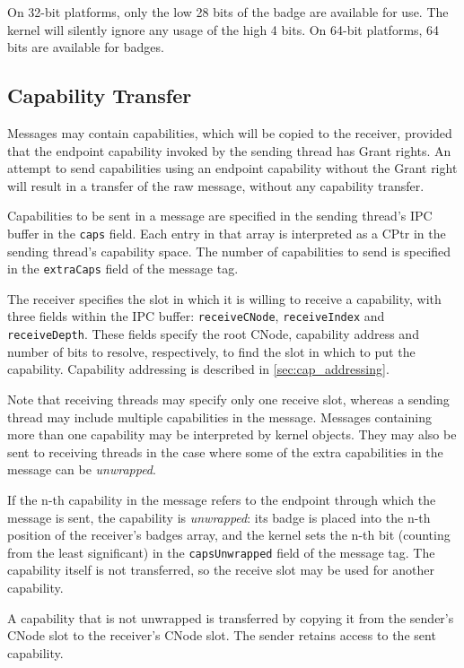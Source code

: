 On 32-bit platforms, only the low 28 bits of the badge are available for use.
The kernel will silently ignore any usage of the high 4 bits.
On 64-bit platforms, 64 bits are available for badges.

\subsection{Capability Transfer}
\label{sec:cap-transfer}

Messages may contain capabilities, which will be copied to the
receiver, provided that the endpoint capability
invoked by the sending thread has Grant rights. An attempt to send
capabilities using an endpoint capability without the Grant right will
result in a transfer of the raw message, without any capability transfer.

Capabilities to be sent in a message are specified in the sending thread's
IPC buffer in the \texttt{caps} field. Each entry in that array is interpreted
as a CPtr in the sending thread's capability space. The number of capabilities
to send is specified in the \texttt{extraCaps} field of the message tag.

The receiver specifies the slot
in which it is willing to receive a capability, with three fields within the IPC buffer: \texttt{receiveCNode}, \texttt{receiveIndex} and \texttt{receiveDepth}.
These fields specify the root CNode, capability address and number of bits to resolve, respectively, to find
the slot in which to put the capability. Capability
addressing is described in \autoref{sec:cap_addressing}.

Note that receiving threads may specify only one receive slot, whereas a
sending thread may include multiple capabilities in the message. Messages
containing more than one capability may be interpreted by kernel objects. They
may also be sent to receiving threads in the case where some of the extra
capabilities in the message can be \emph{unwrapped}.

If the n-th capability in the message refers to the endpoint through
which the message is sent, the capability is \emph{unwrapped}: its badge is placed into
the n-th
position of the receiver's badges array, and the kernel sets the n-th bit (counting from the
least significant) in the \texttt{capsUnwrapped} field of the message
tag. The capability itself is not transferred, so the receive slot may be used
for another capability.

A capability that is not unwrapped is transferred by copying it from the
sender's CNode slot to the receiver's CNode slot. The sender retains access
to the sent capability.

